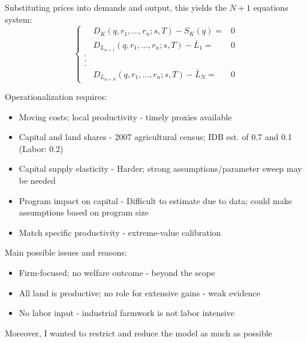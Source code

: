 \documentclass[12pt]{article}
\begin{document}
Substituting prices into demands and output, this yields the \(N+1\) equations system:
\begin{equation}
\left\{
\begin{aligned}
  &D_K(q, r_1, ..., r_n; s, T) - S_K(q) =& 0 \\
  &D_{L_{n=1}}(q, r_1, ..., r_n; s, T) - \bar L_1 =& 0 \\
  .&&\\
  .&&\\
  .&&\\
  &D_{L_{n=N}}(q, r_1, ..., r_n; s, T) - \bar L_N =& 0   
\end{aligned}
\right.
\end{equation}


Operationalization requires:
\begin{itemize}
  \item Moving costs; local productivity - timely proxies available
  \item Capital and land shares - 2007 agricultural census; IDB est. of 0.7 and 0.1 (Labor: 0.2)
  \item Capital supply elasticity - Harder; strong assumptions/parameter sweep may be needed
  \item Program impact on capital - Difficult to estimate due to data; could make assumptions based on program size
  \item Match specific productivity - extreme-value calibration
\end{itemize}
\vspace{1em}

Main possible issues and reasons:
\begin{itemize}
  \item Firm-focused; no welfare outcome - beyond the scope
  \item All land is productive; no role for extensive gains - weak evidence
  \item No labor input - industrial farmwork is not labor intensive
\end{itemize}
Moreover, I wanted to restrict and reduce the model as much as possible 
\end{document}

